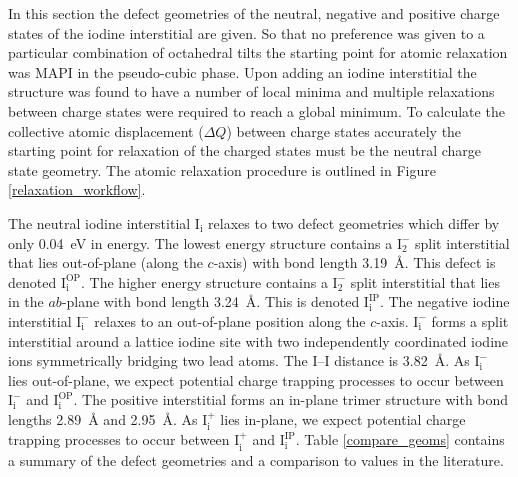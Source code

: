 In this section the defect geometries of the neutral, negative and positive charge states of the iodine interstitial are given. So that no preference was given to a particular combination of octahedral tilts the starting point for atomic relaxation was MAPI in the pseudo-cubic phase. Upon adding an iodine interstitial the structure was found to have a number of local minima and multiple relaxations between charge states were required to reach a global minimum. To calculate the collective atomic displacement ($\Delta Q$) between charge states accurately the starting point for relaxation of the charged states must be the neutral charge state geometry. The atomic relaxation procedure is outlined in Figure \ref{relaxation_workflow}.

The neutral iodine interstitial $\mathrm{I}_\mathrm{i}$ relaxes to two defect geometries which differ by only \SI{0.04}{\electronvolt} in energy. The lowest energy structure contains a $\mathrm{I}_2^-$ split interstitial that lies out-of-plane (along the $c$-axis) with bond length \SI{3.19}{\angstrom}. This defect is denoted $\mathrm{I}_\mathrm{i}^{\textrm{OP}}$. The higher energy structure contains a $\mathrm{I}_2^-$ split interstitial that lies in the $ab$-plane with bond length \SI{3.24}{\angstrom}. This is denoted $\mathrm{I}_\mathrm{i}^{\textrm{IP}}$. The negative iodine interstitial 
$\mathrm{I}_\mathrm{i}^-$ relaxes to an out-of-plane position along the $c$-axis. $\mathrm{I}_\mathrm{i}^-$ forms a split interstitial around a lattice iodine site with two independently coordinated iodine ions symmetrically bridging two lead atoms. The I--I distance is \SI{3.82}{\angstrom}. As $\mathrm{I}_\mathrm{i}^-$ lies out-of-plane, we expect potential charge trapping processes to occur between $\mathrm{I}_\mathrm{i}^-$ and $\mathrm{I}_\mathrm{i}^{\textrm{OP}}$. The positive interstitial forms an in-plane trimer structure with bond lengths \SI{2.89}{\angstrom} and \SI{2.95}{\angstrom}. As $\mathrm{I}_\mathrm{i}^+$ lies in-plane, we expect potential charge trapping processes to occur between $\mathrm{I}_\mathrm{i}^+$ and $\mathrm{I}_\mathrm{i}^{\textrm{IP}}$.
Table \ref{compare_geoms} contains a summary of the defect geometries and a comparison to values in the literature.

